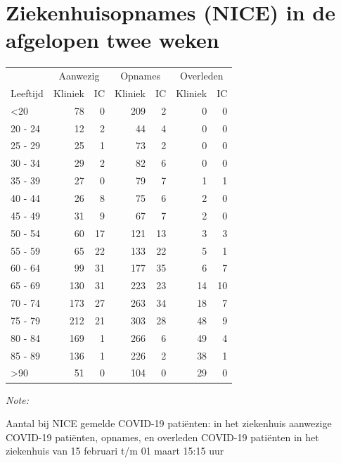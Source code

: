 \documentclass[
  english,
  man,floatsintext]{apa6}
\begin{document}
\newpage

\hypertarget{ziekenhuisopnames-nice-in-de-afgelopen-twee-weken}{%
\section{Ziekenhuisopnames (NICE) in de afgelopen twee weken}\label{ziekenhuisopnames-nice-in-de-afgelopen-twee-weken}}

\begin{table}
\centering\begingroup\fontsize{10}{12}\selectfont

\begin{threeparttable}
\begin{tabular}{lrrrrrr}
\toprule
\multicolumn{1}{c}{ } & \multicolumn{2}{c}{Aanwezig} & \multicolumn{2}{c}{Opnames} & \multicolumn{2}{c}{Overleden} \\
\cmidrule(l{3pt}r{3pt}){2-3} \cmidrule(l{3pt}r{3pt}){4-5} \cmidrule(l{3pt}r{3pt}){6-7}
Leeftijd & Kliniek & IC & Kliniek & IC & Kliniek & IC\\
\midrule
<20 & 78 & 0 & 209 & 2 & 0 & 0\\
20 - 24 & 12 & 2 & 44 & 4 & 0 & 0\\
25 - 29 & 25 & 1 & 73 & 2 & 0 & 0\\
30 - 34 & 29 & 2 & 82 & 6 & 0 & 0\\
35 - 39 & 27 & 0 & 79 & 7 & 1 & 1\\
40 - 44 & 26 & 8 & 75 & 6 & 2 & 0\\
45 - 49 & 31 & 9 & 67 & 7 & 2 & 0\\
50 - 54 & 60 & 17 & 121 & 13 & 3 & 3\\
55 - 59 & 65 & 22 & 133 & 22 & 5 & 1\\
60 - 64 & 99 & 31 & 177 & 35 & 6 & 7\\
65 - 69 & 130 & 31 & 223 & 23 & 14 & 10\\
70 - 74 & 173 & 27 & 263 & 34 & 18 & 7\\
75 - 79 & 212 & 21 & 303 & 28 & 48 & 9\\
80 - 84 & 169 & 1 & 266 & 6 & 49 & 4\\
85 - 89 & 136 & 1 & 226 & 2 & 38 & 1\\
>90 & 51 & 0 & 104 & 0 & 29 & 0\\
\bottomrule
\end{tabular}
\begin{tablenotes}
\item \textit{Note: } 
\item Aantal bij NICE gemelde COVID-19 patiënten: in het ziekenhuis aanwezige COVID-19 patiënten, opnames, en overleden COVID-19 patiënten in het ziekenhuis van 15 februari t/m 01 maart 15:15 uur
\end{tablenotes}
\end{threeparttable}
\endgroup{}
\end{table}
\end{document}

